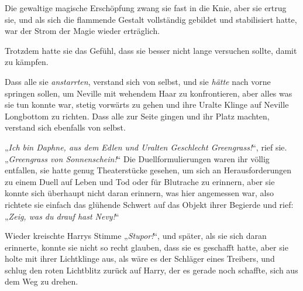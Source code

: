 Die gewaltige magische Erschöpfung zwang sie fast in die Knie, aber sie ertrug sie, und als sich die flammende Gestalt vollständig gebildet und stabilisiert hatte, war der Strom der Magie wieder erträglich.

Trotzdem hatte sie das Gefühl, dass sie besser nicht lange versuchen sollte, damit zu kämpfen.

Dass alle sie \emph{anstarrten}, verstand sich von selbst, und sie \emph{hätte} nach vorne springen sollen, um Neville mit wehendem Haar zu konfrontieren, aber alles was sie tun konnte war, stetig vorwärts zu gehen und ihre Uralte Klinge auf Neville Longbottom zu richten. Dass alle zur Seite gingen und ihr Platz machten, verstand sich ebenfalls von selbst.

„\emph{Ich bin Daphne, aus dem Edlen und Uralten Geschlecht Greengrass!}“, rief sie. „\emph{Greengrass von Sonnenschein!}“ Die Duellformulierungen waren ihr völlig entfallen, sie hatte genug Theaterstücke gesehen, um sich an Herausforderungen zu einem Duell auf Leben und Tod oder für Blutrache zu erinnern, aber sie konnte sich überhaupt nicht daran erinnern, was hier angemessen war, also richtete sie einfach das glühende Schwert auf das Objekt ihrer Begierde und rief: „\emph{Zeig, was du drauf hast Nevy!}“

Wieder kreischte Harrys Stimme „\emph{Stupor!}“, und später, als sie sich daran erinnerte, konnte sie nicht so recht glauben, dass sie es geschafft hatte, aber sie holte mit ihrer Lichtklinge aus, als wäre es der Schläger eines Treibers, und schlug den roten Lichtblitz zurück auf Harry, der es gerade noch schaffte, sich aus dem Weg zu drehen.

